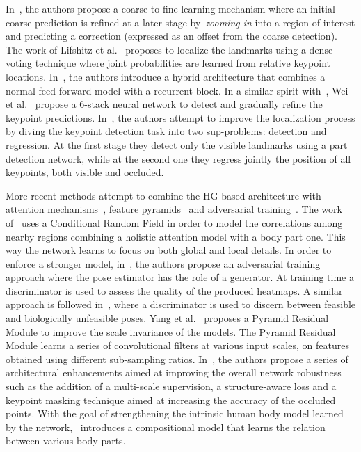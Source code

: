 \documentclass[a4paper, 10pt, conference]{ieeeconf}      \usepackage{FG2020}
\begin{document}
In~\cite{tompson2015efficient}, the authors propose a coarse-to-fine learning mechanism where an initial coarse prediction is refined at a later stage by~\textit{zooming-in} into a region of interest and predicting a correction (expressed as an offset from the coarse detection). The work of Lifshitz et al.~\cite{lifshitz2016human} proposes to localize the landmarks using a dense voting technique where joint probabilities are learned from relative keypoint locations. In~\cite{belagiannis2017recurrent}, the authors introduce a hybrid architecture that combines a normal feed-forward model with a recurrent block. In a similar spirit with~\cite{newell2016stacked}, Wei et al.~\cite{wei2016convolutional} propose a 6-stack neural network to detect and gradually refine the keypoint predictions. In~\cite{bulat2016human}, the authors attempt to improve the localization process by diving the keypoint detection task into two sup-problems: detection and regression. At the first stage they detect only the visible landmarks using a part detection network, while at the second one they regress jointly the position of all keypoints, both visible and occluded. 

More recent methods attempt to combine the HG based architecture with attention mechanisms~\cite{chu2017multi}, feature pyramids~\cite{yang2017learning} and adversarial training~\cite{chou2017self,chen2017adversarial}. The work of~\cite{chu2017multi} uses a Conditional Random Field in order to model the correlations among nearby regions combining a holistic attention model with a body part one. This way the network learns to focus on both global and local details. In order to enforce a stronger model, in~\cite{chou2017self}, the authors propose an adversarial training approach where the pose estimator has the role of a generator. At training time a discriminator is used to assess the quality of the produced heatmaps. A similar approach is followed in~\cite{chen2017adversarial}, where a discriminator is used to discern between feasible and biologically unfeasible poses. Yang et al.~\cite{yang2017learning} proposes a Pyramid Residual Module to improve the scale invariance of the models. The Pyramid Residual Module learns a series of convolutional filters at various input scales, on features obtained using different sub-sampling ratios. In~\cite{ke2018multi}, the authors propose a series of architectural enhancements aimed at improving the overall network robustness such as the addition of a multi-scale supervision, a structure-aware loss and a keypoint masking technique aimed at increasing the accuracy of the occluded points. With the goal of strengthening the intrinsic human body model learned by the network,~\cite{tang2018deeply} introduces a compositional model that learns the relation between various body parts.
\end{document}
